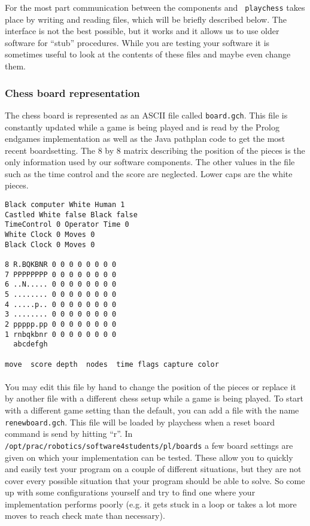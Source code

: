 \documentclass[10pt]{scrartcl}
\begin{document}
For the most part communication between the components and {\tt
playchess} takes place by writing and reading files, which will be
briefly described below. The interface is not the best possible, but it
works and it allows us to use older software for ``stub'' procedures.
While you are testing your software it is sometimes useful to look at
the contents of these files and maybe even change them.

\subsubsection{Chess board representation}
\label{sec:chess-board-repr}

The chess board is represented as an ASCII file called \verb|board.gch|.
This file is constantly updated while a game is being played and is read
by the Prolog endgames implementation as well as the Java pathplan code
to get the most recent boardsetting.  The 8 by 8 matrix describing the
position of the pieces is the only information used by our software
components. The other values in the file such as the time control and
the score are neglected. Lower caps are the white pieces. 

\begin{minipage}{\textwidth} %
\begin{verbatim}
Black computer White Human 1
Castled White false Black false
TimeControl 0 Operator Time 0
White Clock 0 Moves 0
Black Clock 0 Moves 0

8 R.BQKBNR 0 0 0 0 0 0 0 0 
7 PPPPPPPP 0 0 0 0 0 0 0 0
6 ..N..... 0 0 0 0 0 0 0 0
5 ........ 0 0 0 0 0 0 0 0
4 .....p.. 0 0 0 0 0 0 0 0
3 ........ 0 0 0 0 0 0 0 0
2 ppppp.pp 0 0 0 0 0 0 0 0
1 rnbqkbnr 0 0 0 0 0 0 0 0
  abcdefgh

move  score depth  nodes  time flags capture color
\end{verbatim}
\end{minipage}

\paragraph{}
You may edit this file by hand to change the position of the pieces or
replace it by another file with a different chess setup while a game is
being played. To start with a different game setting than the default,
you can add a file with the name \verb|renewboard.gch|. This file will
be loaded by playchess when a reset board command is send by hitting
``r''.
In \verb|/opt/prac/robotics/software4students/pl/boards| a few board settings are given on
which your implementation can be tested. These allow you to quickly and easily test your program
on a couple of different situations, but they are not cover every possible situation that your program
should be able to solve. So come up with some configurations yourself and try to find one where your
implementation performs poorly (e.g. it gets stuck in a loop or takes a lot more moves to reach
check mate than necessary).
\end{document}
